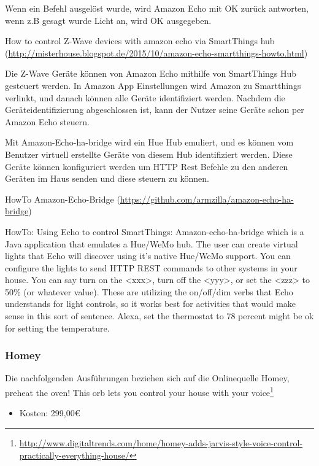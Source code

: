 Wenn ein Befehl ausgelöst wurde, wird Amazon Echo mit \glqq OK\grqq{} zurück antworten, wenn z.B gesagt wurde \glqq Licht an\grqq , wird \glqq OK\grqq{} ausgegeben.

How to control Z-Wave devices with amazon echo via SmartThings hub (\url{http://misterhouse.blogspot.de/2015/10/amazon-echo-smartthings-howto.html})

Die Z-Wave Geräte können von Amazon Echo mithilfe von SmartThings Hub gesteuert werden. In
Amazon App Einstellungen wird Amazon zu Smartthings verlinkt, und danach können alle Geräte
identifiziert werden. Nachdem die Geräteidentifizierung abgeschlossen ist, kann der Nutzer seine Geräte schon per Amazon Echo steuern.

Mit Amazon-Echo-ha-bridge wird ein Hue Hub emuliert, und es können vom Benutzer virtuell erstellte Geräte von diesem Hub identifiziert werden. Diese Geräte können konfiguriert werden um HTTP Rest Befehle zu den anderen Geräten im Haus senden und diese steuern zu können.

HowTo Amazon-Echo-Bridge (\url{https://github.com/armzilla/amazon-echo-ha-bridge})

\noindent
\glqq HowTo: Using Echo to control SmartThings:
Amazon-echo-ha-bridge which is a Java application that emulates a Hue/WeMo hub. The user can
create virtual \glqq lights\grqq{} that Echo will discover using it's native Hue/WeMo support. You can configure the \glqq lights\grqq{} to send HTTP REST commands to other systems in your house. You can say \glqq turn on the <xxx>\grqq , \glqq turn off the <yyy>\grqq , or \glqq set the <zzz> to 50\%\grqq{} (or whatever value). These are utilizing the on/off/dim verbs that Echo understands for light controls, so it works best for activities that would make sense in this sort of sentence. \glqq Alexa, set the thermostat to 78 percent\grqq{} might be ok for setting the temperature.\grqq

\subsubsection{Homey}
Die nachfolgenden Ausführungen beziehen sich auf die Onlinequelle \glqq Homey, preheat the oven! This orb lets you control your house with your voice\grqq\footnote{\url{http://www.digitaltrends.com/home/homey-adds-jarvis-style-voice-control-practically-everything-house/}}

\begin{itemize}
\item Kosten: 299,00€
\end{itemize}

